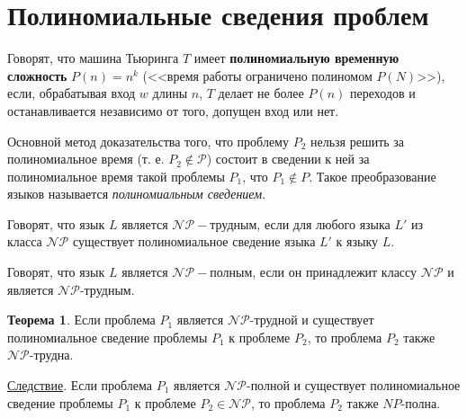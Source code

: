\section{Полиномиальные сведения проблем}
Говорят, что машина Тьюринга $T$ имеет \textbf{полиномиальную временную сложность} $P(n)=n^k$ (<<время работы ограничено полиномом $P(N)$>>), если, обрабатывая вход $w$ длины $n$, $T$ делает не более $P(n)$ переходов и останавливается независимо от того, допущен вход или нет.

Основной метод доказательства того, что проблему $P_2$ нельзя решить за полиномиальное время (т. е. $P_2 \not\in \mathscr{P}$) состоит в сведении к ней за полиномиальное время такой проблемы $P_1$, что $P_1 \not\in P$. Такое преобразование языков называется \textit{полиномиальным сведением}.

\dftion Говорят, что язык $L$ является $\mathscr{NP}-\text{трудным}$, если для любого языка $L'$ из класса $\mathscr{NP}$ существует полиномиальное сведение языка $L'$ к языку $L$.

\dftion Говорят, что язык $L$ является $\mathscr{NP}-\textbf{полным}$, если он принадлежит классу $\mathscr{NP}$ и является $\mathscr{NP}\text{-трудным}$.

\textbf{Теорема 1}. Если проблема $P_1$ является $\mathscr{NP}$-трудной и существует полиномиальное сведение проблемы $P_1$ к проблеме $P_2$, то проблема $P_2$ также $\mathscr{NP}$-трудна.

\underline{Следствие}. Если проблема $P_1$ является $\mathscr{NP}$-полной и существует полиномиальное сведение проблемы $P_1$ к проблеме $P_2 \in \mathscr{NP}$, то проблема $P_2$ также $NP$-полна.